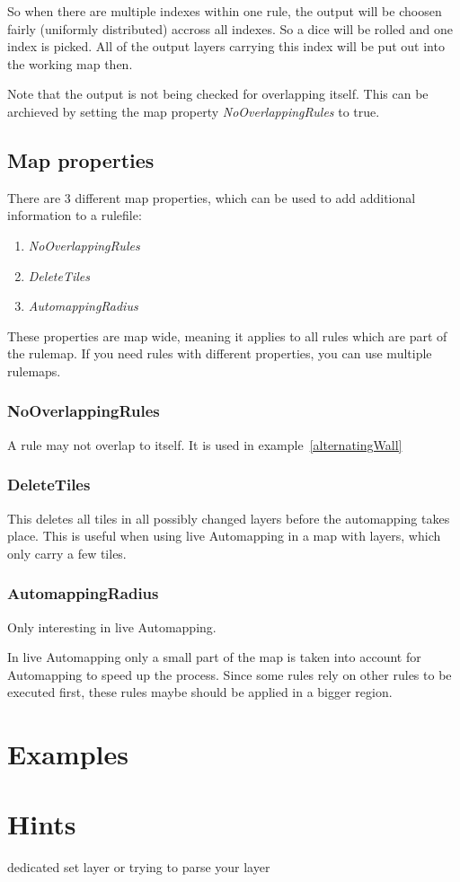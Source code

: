 \documentclass[dvips, a4paper, 12pt,listof=totoc, oneside, parskip]{scrbook}
\begin{document}
So when there are multiple indexes within one rule, the output will be choosen
fairly (uniformly distributed) accross all indexes. So a dice will be rolled and one index is picked.
All of the output layers carrying this index will be put out into the working map then.

Note that the output is not being checked for overlapping itself. This can be archieved by
setting the map property \emph{NoOverlappingRules} to true.




\section{Map properties}

There are 3 different map properties, which can be used to add additional
information to a rulefile:
\begin{enumerate}
  \item \emph{NoOverlappingRules}
  \item \emph{DeleteTiles}
  \item \emph{AutomappingRadius}
\end{enumerate}
These properties are map wide, meaning it applies to all rules which are part of the rulemap.
If you need rules with different properties, you can use multiple rulemaps.


\subsection{NoOverlappingRules}
A rule may not overlap to itself. It is used in example~\ref{alternatingWall}

\subsection{DeleteTiles}
This deletes all tiles in all possibly changed layers before the automapping takes place.
This is useful when using live Automapping in a map with layers, which only carry
a few tiles.

\subsection{AutomappingRadius}
Only interesting in live Automapping.

In live Automapping only a small part of the map is taken into account for Automapping to speed
up the process.
Since some rules rely on other rules to be executed first, these rules maybe should be
applied in a bigger region.

\chapter{Examples}







\chapter{Hints}

dedicated set layer or trying to parse your layer
\end{document}
